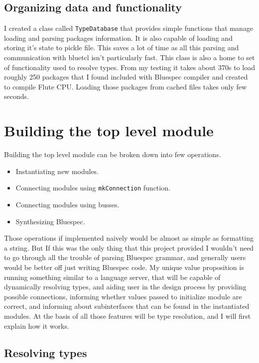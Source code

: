 \documentclass[14pt]{report}
\begin{document}
\subsection{Organizing data and functionality}
I created a class called \verb!TypeDatabase! that provides simple functions that manage loading and parsing packages information. It is also capable of loading and storing it's state to pickle file. This saves a lot of time as all this parsing and communication with bluetcl isn't particularly fast. This class is also a home to set of functionality used to resolve types. From my testing it takes about 370s to load roughly 250 packages that I found included with Bluespec compiler and created to compile Flute CPU. Loading those packages from cached files takes only few seconds.

\section{Building the top level module}
Building the top level module can be broken down into few operations.
\begin{itemize}
    \item Instantiating new modules.
    \item Connecting modules using \verb!mkConnection! function.
    \item Connecting modules using busses.
    \item Synthesizing Bluespec.
\end{itemize} 
Those operations if implemented naively would be almost as simple as formatting a string. But If this was the only thing that this project provided I wouldn't need to go through all the trouble of parsing Bluespec grammar, and generally users would be better off just writing Bluespec code. My unique value proposition is running something similar to a language server, that will be capable of dynamically resolving types, and aiding user in the design process by providing possible connections, informing whether values passed to initialize module are correct, and informing about subinterfaces that can be found in the instantiated modules. 
At the basis of all those features will be type resolution, and I will first explain how it works.
\subsection{Resolving types}
\end{document}
